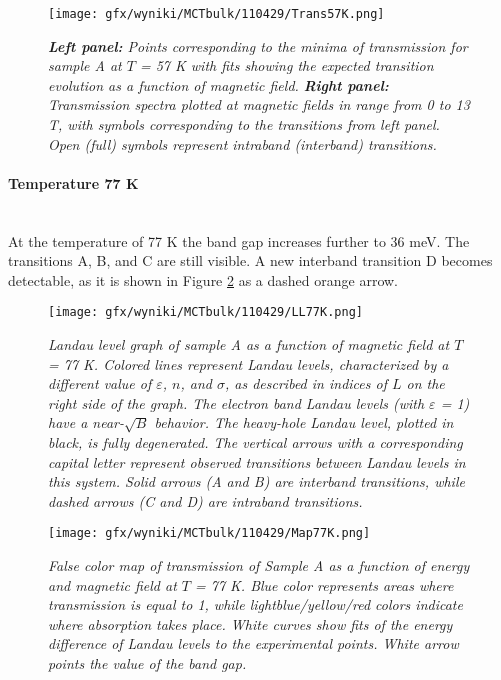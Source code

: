 \documentclass[titlepage,a4paper]{book}
\newcommand{\wciecie}{\quad\phantom{v}}
\newcommand{\myparagraph}[1]{\paragraph{#1}\mbox{}\\}
\begin{document}
\begin{figure}[H]
	\centering
	\texttt{[image: gfx/wyniki/MCTbulk/110429/Trans57K.png]}
	\vspace{-10pt}
	\caption{\textit{\textbf{Left panel:} Points corresponding to the minima of transmission for sample A at $T$ = 57 K with fits showing the expected transition evolution as a function of magnetic field. \textbf{Right panel:} Transmission spectra plotted at magnetic fields in range from 0 to 13 T, with symbols corresponding to the transitions from left panel. Open (full) symbols represent intraband (interband) transitions.}}
	\label{fig:Spectra_110429_57K}
\end{figure}  

\myparagraph{Temperature 77 K}
\wciecie
At the temperature of 77 K the band gap increases further to 36 meV. The transitions A, B, and C are still visible. A new interband transition D becomes detectable, as it is shown in Figure \ref{fig:LL_110429_77K} as a dashed orange arrow.
\begin{figure}[H]
	\centering
	\texttt{[image: gfx/wyniki/MCTbulk/110429/LL77K.png]}
	\vspace{-10pt}
	\caption{\textit{Landau level graph of sample A as a function of magnetic field at $T$ = 77 K. Colored lines represent Landau levels, characterized by a different value of $\varepsilon$, $n$, and $\sigma$, as described in indices of $L$ on the right side of the graph. The electron band Landau levels (with $\varepsilon$ = 1) have a near-$\sqrt{B}$ behavior. The heavy-hole Landau level, plotted in black, is fully degenerated. The vertical arrows with a corresponding capital letter represent observed transitions between Landau levels in this system. Solid arrows (A and B) are interband transitions, while dashed arrows (C and D) are intraband transitions.}}
	\label{fig:LL_110429_77K}
\end{figure}

\begin{figure}[ht]
	\centering
	\texttt{[image: gfx/wyniki/MCTbulk/110429/Map77K.png]}
	\vspace{-10pt}
	\caption{\textit{False color map of transmission of Sample A as a function of energy and magnetic field at $T$ = 77 K. Blue color represents areas where transmission is equal to 1, while lightblue/yellow/red colors indicate where absorption takes place. White curves show fits of the energy difference of Landau levels to the experimental points. White arrow points the value of the band gap.}}
	\label{fig:Map_110429_77K}
\end{figure} 
\end{document}
